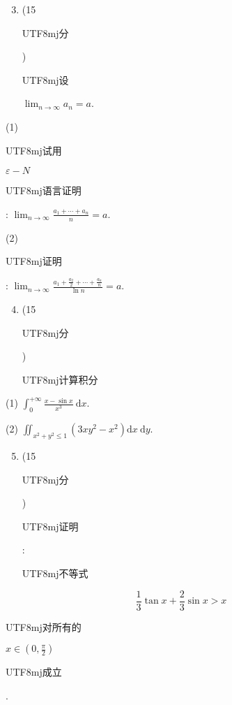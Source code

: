 \documentclass[10pt]{article}
\begin{document}
\begin{enumerate}
  \setcounter{enumi}{2}
  \item (15 \begin{CJK}{UTF8}{mj}分\end{CJK}) \begin{CJK}{UTF8}{mj}设\end{CJK} $\lim _{n \rightarrow \infty} a_{n}=a$.
\end{enumerate}
(1) \begin{CJK}{UTF8}{mj}试用\end{CJK} $\varepsilon-N$ \begin{CJK}{UTF8}{mj}语言证明\end{CJK}: $\lim _{n \rightarrow \infty} \frac{a_{1}+\cdots+a_{n}}{n}=a$.

(2) \begin{CJK}{UTF8}{mj}证明\end{CJK}: $\lim _{n \rightarrow \infty} \frac{a_{1}+\frac{a_{2}}{2}+\cdots+\frac{a_{n}}{n}}{\ln n}=a$.

\begin{enumerate}
  \setcounter{enumi}{3}
  \item (15 \begin{CJK}{UTF8}{mj}分\end{CJK}) \begin{CJK}{UTF8}{mj}计算积分\end{CJK}
\end{enumerate}
(1) $\int_{0}^{+\infty} \frac{x-\sin x}{x^{3}} \mathrm{~d} x$.

(2) $\iint_{x^{2}+y^{2} \leqslant 1}\left(3 x y^{2}-x^{2}\right) \mathrm{d} x \mathrm{~d} y$.

\begin{enumerate}
  \setcounter{enumi}{4}
  \item (15 \begin{CJK}{UTF8}{mj}分\end{CJK}) \begin{CJK}{UTF8}{mj}证明\end{CJK}: \begin{CJK}{UTF8}{mj}不等式\end{CJK}
\end{enumerate}
$$
\frac{1}{3} \tan x+\frac{2}{3} \sin x>x
$$
\begin{CJK}{UTF8}{mj}对所有的\end{CJK} $x \in\left(0, \frac{\pi}{2}\right)$ \begin{CJK}{UTF8}{mj}成立\end{CJK}.
\end{document}
